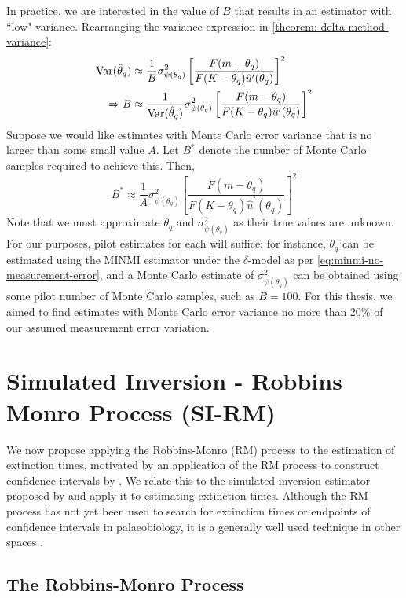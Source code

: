 In practice, we are interested in the value of $B$ that results in an estimator with ``low" variance. Rearranging the variance expression in \autoref{theorem: delta-method-variance}:
\begin{align*}
    \mathrm{Var}(\hat\theta_q) &\approx \frac{1}{B}\sigma^2_{\psi(\theta_q)} \left[ \frac{F(m-\theta_q)}{F(K-\theta_q)\hat{u}^\prime(\theta_q)} \right]^2 \\
    \Rightarrow B &\approx \frac{1}{\mathrm{Var}(\hat\theta_q)}\sigma^2_{\psi(\theta_q)} \left[ \frac{F(m-\theta_q)}{F(K-\theta_q)\hat{u}^\prime(\theta_q)} \right]^2
\end{align*}
Suppose we would like estimates with Monte Carlo error variance that is no larger than some small value $A$. Let $B^*$ denote the number of Monte Carlo samples required to achieve this. Then,
\begin{equation}\label{eqn:minmi-optimal-b}
    B^* \approx \frac{1}{A}\sigma^2_{\psi(\theta_q)} \left[ \frac{F(m-\theta_q)}{F(K-\theta_q)\hat{u}^\prime(\theta_q)} \right]^2
\end{equation}
Note that we must approximate $\theta_q$ and $\sigma^2_{\psi(\theta_q)}$ as their true values are unknown. For our purposes, pilot estimates for each will suffice: for instance, $\theta_q$ can be estimated using the MINMI estimator under the $\delta$-model as per \autoref{eq:minmi-no-measurement-error}, and a Monte Carlo estimate of $\sigma^2_{\psi(\theta_q)}$ can be obtained using some pilot number of Monte Carlo samples, such as $B=100$. For this thesis, we aimed to find estimates with Monte Carlo error variance no more than 20\% of our assumed measurement error variation.

\section{Simulated Inversion - Robbins Monro Process (SI-RM)}

We now propose applying the Robbins-Monro (RM) process to the estimation of extinction times, motivated by an application of the RM process to construct confidence intervals by \citet{Garthwaite1992}. We relate this to the simulated inversion estimator proposed by \citet{Huang2019} and apply it to estimating extinction times. Although the RM process has not yet been used to search for extinction times or endpoints of confidence intervals in palaeobiology, it is a generally well used technique in other spaces \cite{Carpenter1999, Fisher2020, Fu2015}.

\subsection{The Robbins-Monro Process}

